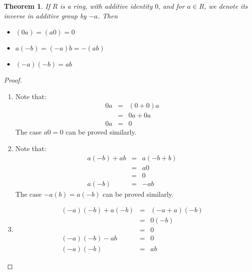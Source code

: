 \documentclass{article}
\theoremstyle{MyNonumberplain}
\theoremstyle{break}
\newtheorem*{proof}{Proof. }
\theoremstyle{break}
\newtheorem{theorem}{Theorem}[section]
\theoremstyle{break}
\theoremstyle{definition}
\theoremstyle{break}
\begin{document}
\begin{thmbox}
    \begin{theorem}
        If $R$ is a ring, with additive identity $0$, and for $a \in R$, we denote its
        inverse in additive group by $- a$. Then\\
        \begin{itemize}
        \item $(0 a) = (a 0) = 0$\\
        
        \item $a (- b) = (- a) b = - (a b)$\\
        
        \item $(- a) (- b) = a b$
        \end{itemize}
    \end{theorem}
    \begin{prfbox}
        \begin{proof}
            \begin{enumerate}
                \item Note that:
                \begin{eqnarray*}
                  0 a & = & (0 + 0) a\\
                  & = & 0 a + 0 a\\
                  0 a & = & 0
                \end{eqnarray*}
                The case $a 0 = 0$ can be proved similarly.\\

                \item Note that:
                \begin{eqnarray*}
                  a (- b) + a b & = & a (- b + b)\\
                  & = & a 0\\
                  & = & 0\\
                  a (- b) & = & - a b
                \end{eqnarray*}
                The case $- a (b) = a (- b)$ can be proved similarly.\\

                \item
                \begin{eqnarray*}
                    (- a) (- b) + a (- b) & = & (- a + a) (- b)\\
                    & = & 0 (- b)\\
                    & = & 0\\
                    (- a) (- b) - a b & = & 0\\
                    (- a) (- b) & = & a b
                  \end{eqnarray*}
            \end{enumerate}
        \end{proof}
    \end{prfbox}
\end{thmbox}
\end{document}
